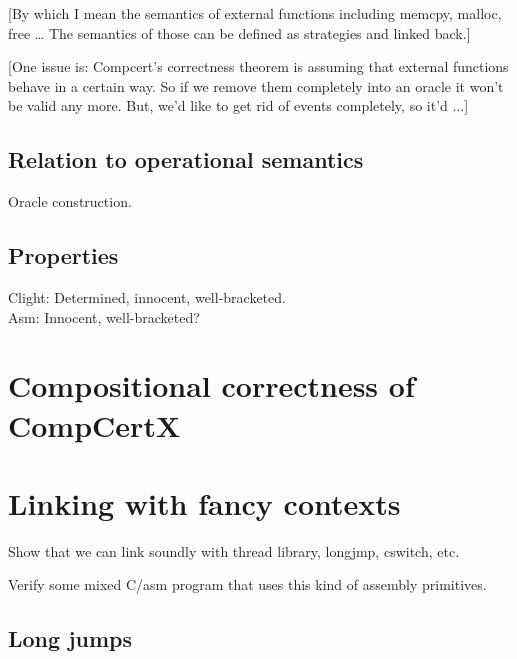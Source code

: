 \documentclass[acmsmall,anonymous]{acmart}
\begin{document}
[By which I mean the semantics of external functions
including memcpy, malloc, free \ldots
The semantics of those can be defined as strategies
and linked back.]

[One issue is:
Compcert's correctness theorem is
assuming that external functions behave in a certain way.
So if we remove them completely into an oracle
it won't be valid any more.
But,
we'd like to get rid of events completely,
so it'd ...]


\subsection{Relation to operational semantics} %

Oracle construction.


\subsection{Properties} %

Clight: Determined, innocent, well-bracketed. \\
Asm: Innocent, well-bracketed?



\newpage
\section{Compositional correctness of CompCertX} %


\section{Linking with fancy contexts} %

Show that we can link soundly with thread library, longjmp, cswitch, etc.

Verify some mixed C/asm program that uses this kind of assembly primitives.

\subsection{Long jumps}
\label{sec:longjmp}
\end{document}
